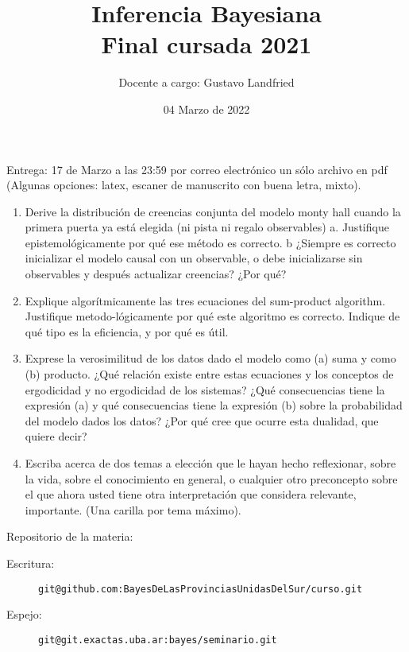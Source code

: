 \documentclass[10pt]{article}
\title{\LARGE Inferencia Bayesiana \\ \Large  Final cursada 2021 }
\author{Docente a cargo: Gustavo Landfried}
\affil{Facultad de Ciencias Exactas y Naturales. Universidad de Buenos Aires.}
\affil[]{Mail: \texttt{glandfried@dc.uba.ar}}
\date{04 Marzo de 2022}
\begin{document}
\maketitle

Entrega: 17 de Marzo a las 23:59 por correo electrónico un sólo archivo en pdf (Algunas opciones: latex, escaner de manuscrito con buena letra, mixto).

\begin{enumerate}

\item Derive la distribución de creencias conjunta del modelo monty hall cuando la primera puerta ya está elegida (ni pista ni regalo observables) a. Justifique epistemológicamente por qué ese método es correcto. b ¿Siempre es correcto inicializar el modelo causal con un observable, o debe inicializarse sin observables y después actualizar creencias? ¿Por qué?

\item Explique algorítmicamente las tres ecuaciones del sum-product algorithm. Justifique metodo-lógicamente por qué este algoritmo es correcto. Indique de qué tipo es la eficiencia, y por qué es útil. 

\item Exprese la verosimilitud de los datos dado el modelo como (a) suma y como (b) producto. ¿Qué relación existe entre estas ecuaciones y los conceptos de ergodicidad y no ergodicidad de los sistemas? ¿Qué consecuencias tiene la expresión (a) y qué consecuencias tiene la expresión (b) sobre la probabilidad del modelo dados los datos? ¿Por qué cree que ocurre esta dualidad, que quiere decir?


\item Escriba acerca de dos temas a elección que le hayan hecho reflexionar, sobre la vida, sobre el conocimiento en general, o cualquier otro preconcepto sobre el que ahora usted tiene otra interpretación que considera relevante, importante. (Una carilla por tema máximo).

\end{enumerate}

\vspace{1cm}

Repositorio de la materia:\\[-.5cm]
\begin{description}
\item[Escritura:] \texttt{git@github.com:BayesDeLasProvinciasUnidasDelSur/curso.git} \\[-0.6cm]
\item[Espejo:] \texttt{git@git.exactas.uba.ar:bayes/seminario.git}
\end{description}
\end{document}
